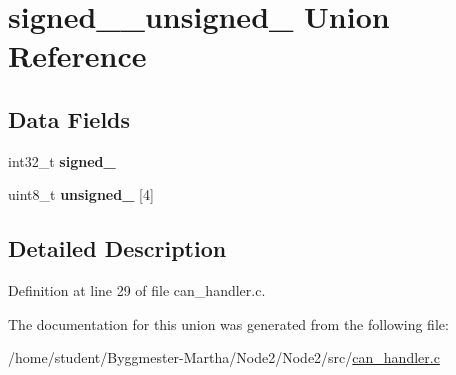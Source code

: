 \hypertarget{unionsigned__32__unsigned__8}{}\section{signed\+\_\+\_\+unsigned\+\_ Union Reference}
\label{unionsigned__32__unsigned__8}
\subsection*{Data Fields}
\begin{DoxyCompactItemize}
\item 
\mbox{\label{unionsigned__32__unsigned__8_a2c538f960108464d193432639858c705}} 
int32\+\_\+t {\bfseries signed\+\_}
\item 
\mbox{\label{unionsigned__32__unsigned__8_a26c51ac22b5d213858222becb22e2060}} 
uint8\+\_\+t {\bfseries unsigned\+\_} \mbox{[}4\mbox{]}
\end{DoxyCompactItemize}


\subsection{Detailed Description}


Definition at line 29 of file can\+\_\+handler.\+c.



The documentation for this union was generated from the following file\+:\begin{DoxyCompactItemize}
\item 
/home/student/\+Byggmester-\/\+Martha/\+Node2/\+Node2/src/\hyperlink{can__handler_8c}{can\+\_\+handler.\+c}\end{DoxyCompactItemize}
